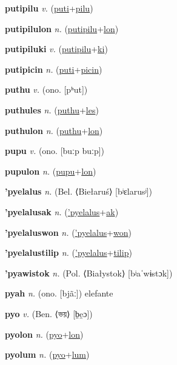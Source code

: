 \textbf{\hypertarget{putipilu}{putipilu}} \textit{v.} (\hyperlink{puti}{puti}+\allowbreak \hyperlink{pilu}{pilu})


\textbf{\hypertarget{putipilulon}{putipilulon}} \textit{n.} (\hyperlink{putipilu}{putipilu}+\allowbreak \hyperlink{lon}{lon})


\textbf{\hypertarget{putipiluki}{putipiluki}} \textit{v.} (\hyperlink{putipilu}{putipilu}+\allowbreak \hyperlink{ki}{ki})


\textbf{\hypertarget{putipicin}{putipicin}} \textit{n.} (\hyperlink{puti}{puti}+\allowbreak \hyperlink{picin}{picin})


\textbf{\hypertarget{puthu}{puthu}} \textit{v.} (ono. [pʰut])


\textbf{\hypertarget{puthules}{puthules}} \textit{n.} (\hyperlink{puthu}{puthu}+\allowbreak \hyperlink{les}{les})


\textbf{\hypertarget{puthulon}{puthulon}} \textit{n.} (\hyperlink{puthu}{puthu}+\allowbreak \hyperlink{lon}{lon})


\textbf{\hypertarget{pupu}{pupu}} \textit{v.} (ono. [buːp buːp])


\textbf{\hypertarget{pupulon}{pupulon}} \textit{n.} (\hyperlink{pupu}{pupu}+\allowbreak \hyperlink{lon}{lon})


\textbf{\hypertarget{'pyelalus}{'pyelalus}} \textit{n.} (Bel. ⟨Biełaruś⟩ [bʲɛlarusʲ])


\textbf{\hypertarget{'pyelalusak}{'pyelalusak}} \textit{n.} (\hyperlink{'pyelalus}{'pyelalus}+\allowbreak \hyperlink{ak}{ak})


\textbf{\hypertarget{'pyelaluswon}{'pyelaluswon}} \textit{n.} (\hyperlink{'pyelalus}{'pyelalus}+\allowbreak \hyperlink{won}{won})


\textbf{\hypertarget{'pyelalustilip}{'pyelalustilip}} \textit{n.} (\hyperlink{'pyelalus}{'pyelalus}+\allowbreak \hyperlink{tilip}{tilip})


\textbf{\hypertarget{'pyawistok}{'pyawistok}} \textit{n.} (Pol. ⟨Białystok⟩ [bʲaˈwɨstɔk])


\textbf{\hypertarget{pyah}{pyah}} \textit{n.} (ono. [bjãː])
elefante

\textbf{\hypertarget{pyo}{pyo}} \textit{v.} (Ben. ⟨{\bengali{}ভয়}⟩ [b̤e̯ɔ])


\textbf{\hypertarget{pyolon}{pyolon}} \textit{n.} (\hyperlink{pyo}{pyo}+\allowbreak \hyperlink{lon}{lon})


\textbf{\hypertarget{pyolum}{pyolum}} \textit{n.} (\hyperlink{pyo}{pyo}+\allowbreak \hyperlink{lum}{lum})


